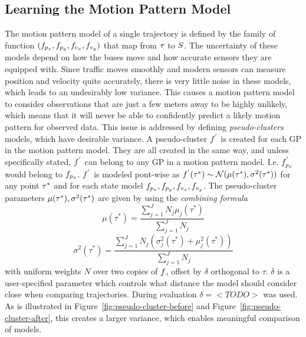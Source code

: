 \subsection{Learning the Motion Pattern Model}
The motion pattern model of a single trajectory is defined by the family of
function $(f_{p_x}, f_{p_y}, f_{v_x}, f_{v_y})$
that map from $\tau$ to $S$.
The uncertainty of these models depend on how the buses move and how
accurate sensors they are equipped with. Since traffic moves smoothly 
and modern sensors can measure position and velocity quite accurately, 
there is very little noise in these models, which leads to an undesirably low variance. 
This causes a motion pattern model to consider observations that are just a few
meters away to be highly unlikely, which means that it will never be
able to confidently predict a likely motion pattern for observed data.
This issue is addressed by defining \textit{pseudo-clusters} models,
which have desirable variance. 
A pseudo-cluster $f^{'}$ is created for each GP in the motion pattern
model. They are all created in the same way, and unless specifically
stated, $f^{'}$ can belong to any GP in a
motion pattern model. I.e. $f^{'}_{p_x}$ would belong to $f_{p_x}$.
$f^{'}$ is modeled pont-wise as
$f^{'}(\tau^*) \sim \mathcal{N}(\mu(\tau^*), \sigma^2(\tau^*))$
for any point $\tau^*$ and for each state model
$f_{p_x}, f_{p_y}, f_{v_x}, f_{v_y}$. The
pseudo-cluster parameters $\mu(\tau^*), \sigma^2(\tau^*)$ are given by using the
\textit{combining formula}~\cite{Tiger2015Jul}
\begin{equation}
  \label{eq:combining-formula-mu}
  \mu(\tau^{*}) = \frac{\sum_{j=1}^{J}N_{j}\mu_j(\tau^{*})}{\sum_{j=1}^{J}N_j}
\end{equation}
\begin{equation}
  \label{eq:combining-formula-sigma}
  \sigma^2(\tau^{*}) =
  \frac{\sum_{j=1}^{J}N_{j}(\sigma^2_j(\tau^{*}) + \mu_j^2(\tau^{*}))}{\sum_{j=1}^{J}N_j}
\end{equation}
with uniform weights $N$ over two copies of $f$, offset by
$\delta$ orthogonal to $\tau$. $\delta$ is a user-specified parameter
which controls what distance the model should consider close when
comparing trajectories. During evaluation $\delta=<TODO>$ was used. As is illustrated in Figure~\ref{fig:pseudo-cluster-before} and
Figure~\ref{fig:pseudo-cluster-after}, this creates a larger variance, 
which enables meaningful comparison of models.
